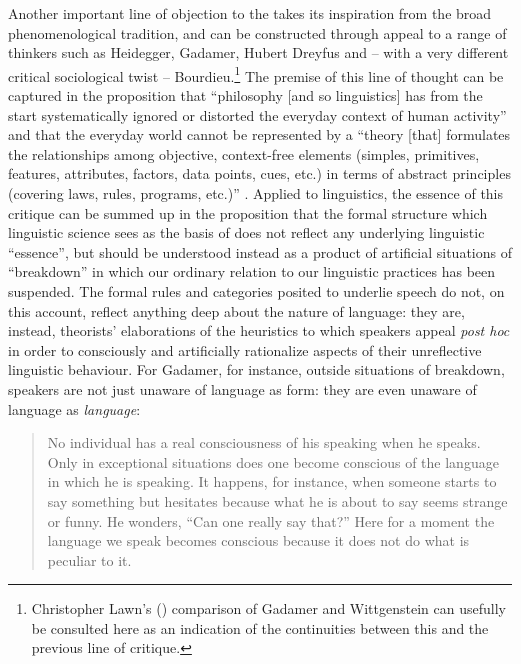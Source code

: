 \documentclass[output=paper]{langscibook}
\begin{document}
Another important line of objection to the  takes its inspiration from the broad phenomenological tradition, and can be constructed through appeal to a range of thinkers such as Heidegger, Gadamer, Hubert Dreyfus and -- with a very different critical sociological twist -- Bourdieu.\footnote{Christopher Lawn’s (\citeyear{Lawn2004}) comparison of Gadamer and Wittgenstein can usefully be consulted here as an indication of the continuities between this and the previous line of critique.} The premise of this line of thought can be captured in the proposition that ``philosophy [and so linguistics] has from the start systematically ignored or distorted the everyday context of human activity'' and that the everyday world cannot be represented by a ``theory [that] formulates the relationships among objective, context-free elements (simples, primitives, features, attributes, factors, data points, cues, etc.) in terms of abstract principles (covering laws, rules, programs, etc.)'' \citep[25, 28]{DreyfusDreyfus1988}. Applied to linguistics, the essence of this critique can be summed up in the proposition that the formal structure which linguistic science sees as the basis of  does not reflect any underlying linguistic ``essence'', but should be understood instead as a product of artificial situations of ``breakdown'' in which our ordinary relation to our linguistic practices has been suspended. The formal rules and categories posited to underlie speech do not, on this account, reflect anything deep about the nature of language: they are, instead, theorists' elaborations of the heuristics to which speakers appeal \emph{post hoc} in order to consciously and artificially rationalize aspects of their unreflective linguistic behaviour. For Gadamer, for instance, outside situations of breakdown, speakers are not just unaware of language as form: they are even unaware of language as \emph{language}:

\begin{quotation}
No individual has a real consciousness of his speaking when he speaks. Only in exceptional situations does one become conscious of the language in which he is speaking. It happens, for instance, when someone starts to say something but hesitates because what he is about to say seems strange or funny. He wonders, ``Can one really say that?'' Here for a moment the language we speak becomes conscious because it does not do what is peculiar to it. \citep[64]{Gadamer19761966}
\end{quotation}
\end{document}
